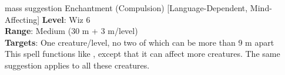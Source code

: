 {mass suggestion}
{Enchantment (Compulsion) [Language-Dependent, Mind-Affecting]}
{
	\textbf{Level}: Wiz 6\\
	\textbf{Range}: Medium (30 m + 3 m/level)\\
	\textbf{Targets}: One creature/level, no two of which can be more than 9 m apart\\
}
{
	This spell functions like , except that it can affect more creatures. The same suggestion applies to all these creatures.
}